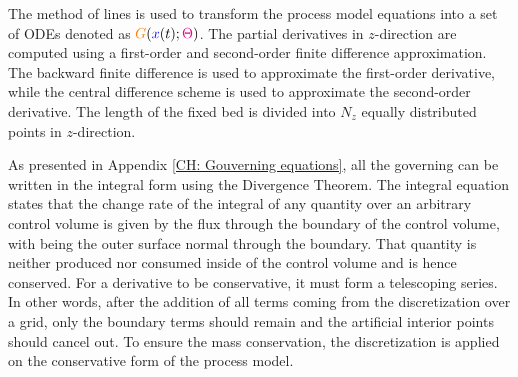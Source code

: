 \documentclass[../Article_Model_Parameters.tex]{subfiles}
\begin{document}
			The method of lines is used to transform the process model equations into a set of ODEs denoted as ${\color{orange}G}({\color{blue}x}(t);{\color{magenta}\Theta})$. The partial derivatives in $z$-direction are computed using a first-order and second-order finite difference approximation. The backward finite difference is used to approximate the first-order derivative, while the central difference scheme is used to approximate the second-order derivative. The length of the fixed bed is divided into $N_z$ equally distributed points in $z$-direction. 
			
			As presented in Appendix \ref{CH: Gouverning equations}, all the governing can be written in the integral form using the Divergence Theorem. The integral equation states that the change rate of the integral of any quantity over an arbitrary control volume is given by the flux through the boundary of the control volume, with being the outer surface normal through the boundary. That quantity is neither produced nor consumed inside of the control volume and is hence conserved. For a derivative to be conservative, it must form a telescoping series. In other words, after the addition of all terms coming from the discretization over a grid, only the boundary terms should remain and the artificial interior points should cancel out. To ensure the mass conservation, the discretization is applied on the conservative form of the process model.
			
%			
%			
			
\end{document}
